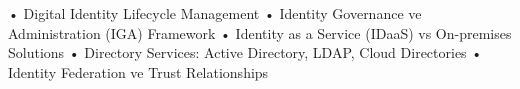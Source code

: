 • Digital Identity Lifecycle Management
• Identity Governance ve Administration (IGA) Framework
• Identity as a Service (IDaaS) vs On-premises Solutions
• Directory Services: Active Directory, LDAP, Cloud Directories
• Identity Federation ve Trust Relationships